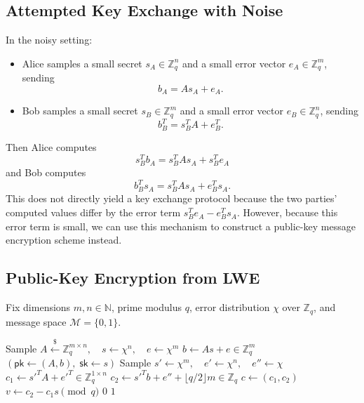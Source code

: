 \subsection*{Attempted Key Exchange with Noise}

In the noisy setting:
\begin{itemize}
    \item Alice samples a small secret \(s_A \in \mathbb{Z}_q^n\) and a small error vector \(e_A \in \mathbb{Z}_q^m\), sending
    \[
        b_A = A s_A + e_A.
    \]
    \item Bob samples a small secret \(s_B \in \mathbb{Z}_q^m\) and a small error vector \(e_B \in \mathbb{Z}_q^n\), sending
    \[
        b_B^T = s_B^T A + e_B^T.
    \]
\end{itemize}
Then Alice computes
\[
    s_B^T b_A = s_B^T A s_A + s_B^T e_A
\]
and Bob computes
\[
    b_B^T s_A = s_B^T A s_A + e_B^T s_A.
\]
This does not directly yield a key exchange protocol because the two parties' computed values differ by the error term \(s_B^T e_A - e_B^T s_A\).
However, because this error term is small, we can use this mechanism to construct a public-key message encryption scheme instead.

\subsection*{Public-Key Encryption from LWE}

\begin{definition}\label{def:lwe-pke}
    Fix dimensions \(m, n \in \mathbb{N}\), prime modulus \(q\), error distribution \(\chi\) over \(\mathbb{Z}_q\), and message space \(\mathcal{M} = \{0, 1\}\).
    \begin{algorithmic}[1]
            \State Sample \(A \xleftarrow{\$} \mathbb{Z}_q^{m \times n}, \quad s \leftarrow \chi^n, \quad e \leftarrow \chi^m\)
            \State \(b \gets As + e \in \mathbb{Z}_q^m\)
            \State \Return \((\mathsf{pk} \gets (A, b), \; \mathsf{sk} \gets s)\)
        \EndProcedure
        \Statex
            \State Sample \(s' \leftarrow \chi^m, \quad e' \leftarrow \chi^n, \quad e'' \leftarrow \chi\)
            \State \(c_1 \gets s'^T A + e'^T \in \mathbb{Z}_q^{1 \times n}\)
            \State \(c_2 \gets s'^T b + e'' + \lfloor q/2 \rfloor m \in \mathbb{Z}_q\)
            \State \Return \(c \gets (c_1, c_2)\)
        \EndProcedure
        \Statex
            \State \(v \gets c_2 - c_1 s \pmod q\)
                \State \Return \(0\)
            \Else
                \State \Return \(1\)
            \EndIf
        \EndProcedure
    \end{algorithmic}
\end{definition}

